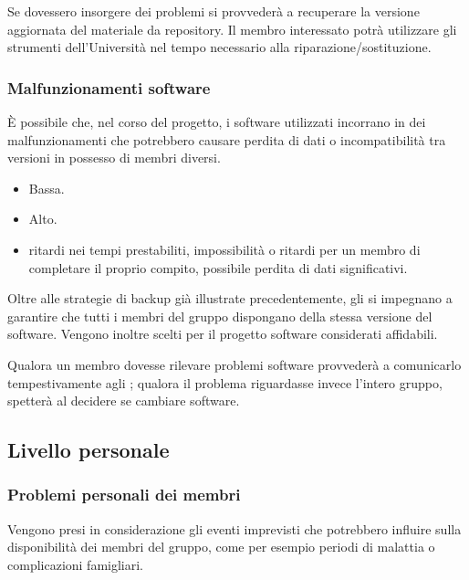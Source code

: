 \documentclass[a4paper, titlepage]{article}
\begin{document}
	Se dovessero insorgere dei problemi si provvederà a recuperare la versione aggiornata del materiale da repository.	Il membro interessato potrà utilizzare gli strumenti dell'Università nel tempo necessario alla riparazione/sostituzione.
	
	
	\subsubsection{Malfunzionamenti software}
	È possibile che, nel corso del progetto, i software utilizzati incorrano in dei malfunzionamenti che potrebbero causare perdita di dati o incompatibilità tra versioni in possesso di membri diversi.
	
	\begin{itemize}
		\item {} Bassa.
		\item {} Alto.
		\item {} ritardi nei tempi prestabiliti, impossibilità o ritardi per un membro di completare il proprio compito, possibile perdita di dati significativi.
	\end{itemize}
	
	Oltre alle strategie di backup già illustrate precedentemente, gli  si impegnano a garantire che tutti i membri del gruppo dispongano della stessa versione del software. Vengono inoltre scelti per il progetto software considerati affidabili.
	
	Qualora un membro dovesse rilevare problemi software provvederà a comunicarlo tempestivamente agli ; qualora il problema riguardasse invece l'intero gruppo, spetterà al  decidere se cambiare software.
	
	
	\subsection{Livello personale}
	\subsubsection{Problemi personali dei membri}
	Vengono presi in considerazione gli eventi imprevisti che potrebbero influire sulla disponibilità dei membri del gruppo, come per esempio periodi di malattia o complicazioni famigliari.
	
\end{document}
